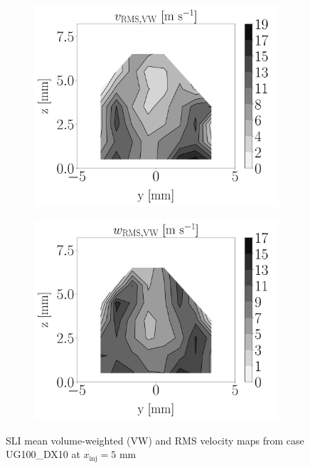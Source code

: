 \begin{figure}[h!]
\begin{subfigure}[b]{0.2\textwidth}
\end{subfigure}
\hspace*{0.45in}
\begin{subfigure}[b]{0.2\textwidth}
	\flushleft
   \includegraphics[scale=0.19]{./part2_developments/figures_ch6_lagrangian_JICF/injectors_SLI/uG100_dx10_x05_uy_RMS_vw_map}
\end{subfigure}
\hspace*{0.45in}
\begin{subfigure}[b]{0.2\textwidth}
	\flushleft
   \includegraphics[scale=0.19]{./part2_developments/figures_ch6_lagrangian_JICF/injectors_SLI/uG100_dx10_x05_uz_RMS_vw_map}
\end{subfigure}

\caption{SLI mean volume-weighted (VW) and RMS velocity maps from case UG100\_DX10 at $x_\mathrm{inj} = 5$ mm }
\label{fig:maps_SLI_with_RMS}
\end{figure}


